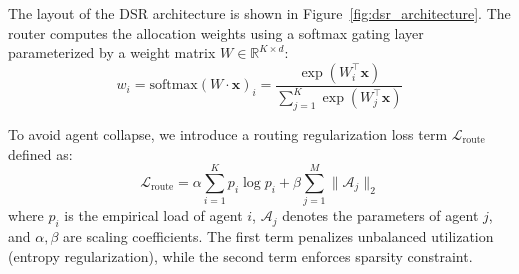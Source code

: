 The layout of the DSR architecture is shown in Figure~\ref{fig:dsr_architecture}. The router computes the allocation weights using a softmax gating layer parameterized by a weight matrix $W \in \mathbb{R}^{K \times d}$:
\begin{equation}
  w_i = \text{softmax}(W \cdot \mathbf{x})_i = \frac{\exp(W_i^\top \mathbf{x})}{\sum_{j=1}^{K} \exp(W_j^\top \mathbf{x})}
  \label{eq:routing_softmax}
\end{equation}

To avoid agent collapse, we introduce a routing regularization loss term $\mathcal{L}_{\text{route}}$ defined as:
\begin{equation}
  \mathcal{L}_{\text{route}} = \alpha \sum_{i=1}^{K} p_i \log p_i + \beta \sum_{j=1}^{M} \| \mathcal{A}_j \|_2
  \label{eq:routing_loss}
\end{equation}
where $p_i$ is the empirical load of agent $i$, $\mathcal{A}_j$ denotes the parameters of agent $j$, and $\alpha, \beta$ are scaling coefficients. The first term penalizes unbalanced utilization (entropy regularization), while the second term enforces sparsity constraint.
